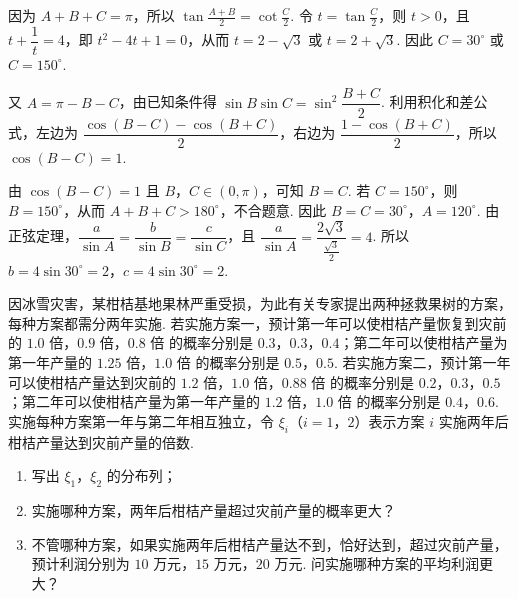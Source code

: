 \begin{solution}
因为 \(A+B+C=\pi\)，所以 \(\tan\frac{A+B}{2}=\cot\frac{C}{2}\). 令 \(t=\tan\frac{C}{2}\)，则 \(t>0\)，且
\(t+\dfrac{1}{t}=4\)，即 \(t^2-4t+1=0\)，从而 \(t=2-\sqrt{3}\) 或 \(t=2+\sqrt{3}\). 因此 \(C=30^\circ\) 或 \(C=150^\circ\).

又 \(A=\pi-B-C\)，由已知条件得 \(\sin B\sin C=\sin^2\dfrac{B+C}{2}\). 利用积化和差公式，左边为 \(\dfrac{\cos(B-C)-\cos(B+C)}{2}\)，右边为 \(\dfrac{1-\cos(B+C)}{2}\)，所以 \(\cos(B-C)=1\).

由 \(\cos(B-C)=1\) 且 \(B\)，\(C\in(0,\pi)\)，可知 \(B=C\). 若 \(C=150^\circ\)，则 \(B=150^\circ\)，从而 \(A+B+C>180^\circ\)，不合题意. 因此 \(B=C=30^\circ\)，\(A=120^\circ\). 由正弦定理，\(\dfrac{a}{\sin A}=\dfrac{b}{\sin B}=\dfrac{c}{\sin C}\)，且 \(\dfrac{a}{\sin A}=\dfrac{2\sqrt{3}}{\frac{\sqrt{3}}{2}}=4\). 所以 \(b=4\sin30^\circ=2\)，\(c=4\sin30^\circ=2\).
\end{solution}

\begin{problem}
因冰雪灾害，某柑桔基地果林严重受损，为此有关专家提出两种拯救果树的方案，每种方案都需分两年实施. 若实施方案一，预计第一年可以使柑桔产量恢复到灾前的 \(1.0\text{ 倍}\)，\(0.9\text{ 倍}\)，\(0.8\text{ 倍}\) 的概率分别是 \(0.3\)，\(0.3\)，\(0.4\)；第二年可以使柑桔产量为第一年产量的 \(1.25\text{ 倍}\)，\(1.0\text{ 倍}\) 的概率分别是 \(0.5\)，\(0.5\). 若实施方案二，预计第一年可以使柑桔产量达到灾前的 \(1.2\text{ 倍}\)，\(1.0\text{ 倍}\)，\(0.88\text{ 倍}\) 的概率分别是 \(0.2\)，\(0.3\)，\(0.5\)；第二年可以使柑桔产量为第一年产量的 \(1.2\text{ 倍}\)，\(1.0\text{ 倍}\) 的概率分别是 \(0.4\)，\(0.6\). 实施每种方案第一年与第二年相互独立，令 \( \xi_i \)（\(i = 1\)，\(2\)）表示方案 \(i\) 实施两年后柑桔产量达到灾前产量的倍数.
\begin{enumerate}
\item 写出 \(\xi_1\)，\(\xi_2\) 的分布列；
\item 实施哪种方案，两年后柑桔产量超过灾前产量的概率更大？
\item 不管哪种方案，如果实施两年后柑桔产量达不到，恰好达到，超过灾前产量，预计利润分别为 \(10\text{ 万元}\)，\(15\text{ 万元}\)，\(20\text{ 万元}\). 问实施哪种方案的平均利润更大？
\end{enumerate}
\end{problem}

